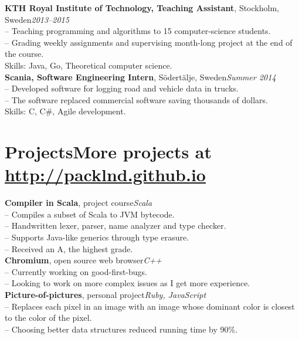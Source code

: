 \documentclass[10pt]{article}
\begin{document}
\noindent\textbf{KTH Royal Institute of Technology, Teaching Assistant}, Stockholm, Sweden\hfill\textit{2013--2015}\\
\indent-- Teaching programming and algorithms to 15 computer-science students.\\
\indent-- Grading weekly assignments and supervising month-long project at the end of the course. \\
\indent Skills: Java, Go, Theoretical computer science. \\

\noindent\textbf{Scania, Software Engineering Intern}, Södertälje, Sweden\hfill\textit{Summer 2014}\\
\indent-- Developed software for logging road and vehicle data in trucks.\\
\indent-- The software replaced commercial software saving thousands of dollars.\\
\indent Skills: C, C\#, Agile development.\\

\section*{Projects\hfill {\normalsize\normalfont  More projects at \url{http://packlnd.github.io}}}
\vspace{0.1em}
\hline
\vspace{0.3em}
\noindent\textbf{Compiler in Scala}, project course\hfill\textit{Scala}\\
\indent-- Compiles a subset of Scala to JVM bytecode.\\
\indent-- Handwritten lexer, parser, name analyzer and type checker.\\
\indent-- Supports Java-like generics through type erasure.\\
\indent-- Received an A, the highest grade.\\

\noindent\textbf{Chromium}, open source web browser\hfill \textit{C++} \\
\indent-- Currently working on good-first-bugs. \\
\indent-- Looking to work on more complex issues as I get more experience.\\

\noindent\textbf{Picture-of-pictures}, personal project\hfill \textit{Ruby, JavaScript} \\
\indent-- Replaces each pixel in an image with an image whose dominant color is closest to the color of the pixel.\\
\indent-- Choosing better data structures reduced running time by 90\%. \\
\end{document}
